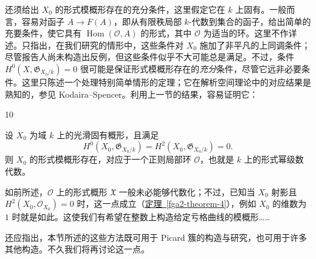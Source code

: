 \par{}还须给出 \(X_0\) 的形式模概形存在的充分条件，这里假定它在 \(k\) 上固有。一般而言，容易对函子 \(A\to  F(A)\)，即从有限秩局部 \(k\)-代数到集合的函子，给出简单的充要条件，使它具有 \(\operatorname {Hom}(\mathcal {O},A)\) 的形式，其中 \(\mathcal {O}\) 为适当的环。这里不作详述。只指出，在我们研究的情形中，这些条件对 \(X_0\) 施加了非平凡的上同调条件；尽管报告人尚未构造出反例，但这些条件似乎不大可能总是满足。不过，条件 \(H^0(X,\mathfrak {G}_{X_0/k})=0\) 很可能是保证形式模概形存在的\emph{充分}条件，尽管它远非必要条件。这里只陈述一个处理特别简单情形的定理；它在解析空间理论中的对应结果是熟知的，参见 Kodaira–Spencer。利用上一节的结果，容易证明它：
\begin{theorem}{10}\label{fga2-theorem-10}\skipsinglepar
\par{}设 \(X_0\) 为域 \(k\) 上的光滑固有概形，且满足 \[       H^0(X_0,\mathfrak {G}_{X_0/k})       = H^2(X_0,\mathfrak {G}_{X_0/k})       = 0.     \] 则 \(X_0\) 的形式模概形存在，对应于一个正则局部环 \(\mathcal {O}\)，也就是 \(k\) 上的形式幂级数代数。\end{theorem}
\par{}如前所述，\(\mathcal {O}\) 上的形式概形 \(\mathfrak {X}\) 一般未必能够代数化；不过，已知当 \(X_0\) 射影且 \(H^2(X_0,\mathcal {O}_{X_0})=0\) 时，这一点成立（\hyperref[fga2-theorem-4]{定理~\ref*{fga2-theorem-4}}），例如 \(X_0\) 的维数为 \(1\) 时就是如此。这使我们有希望在整数上构造给定亏格曲线的模概形……
\par{}还应指出，本节所述的这些方法既可用于 Picard 簇的构造与研究，也可用于许多其他构造。不久我们将再讨论这一点。
